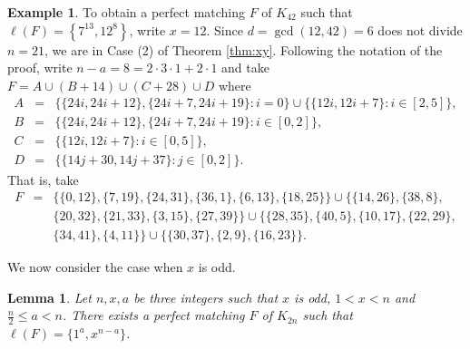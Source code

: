 \documentclass{amsart}
\newtheorem{lem}[defi]{Lemma}
\theoremstyle{definition}
\newtheorem{ex}[defi]{Example}
\numberwithin{equation}{section}
\begin{document}
\begin{ex}
To obtain a perfect matching $F$ of $K_{42}$ such that $\ell(F)=\left\{7^{13}, 12^{8}\right\}$, write
$x=12$. Since $d=\gcd(12,42)=6$ does not divide $n=21$,  we are in Case (2) of Theorem \ref{thm:xy}.
Following the notation of the proof, write
$n-a= 8 = 2\cdot 3 \cdot 1 + 2\cdot 1$ and take $F=A \cup (B+14)\cup (C+28) \cup D$ where
$$\begin{array}{rcl}
A & =&  \{\{24i,24i+12\}, \{24i+7,24i+19\}: i=0\} \cup \{ \{12i,12i+7\} : i \in [2,5]\}, \\
B &=& \{\{24i, 24i+12\}, \{24i+7, 24i+19\}: i \in [0,2]\},\\
C &=& \{\{12i, 12i+7\}: i \in [0,5]\},\\
D &=& \{\{14j+30, 14j+37\}: j \in [0,2]\}.
    \end{array}$$
That is, take
$$\begin{array}{rcl}
F &= & \{  \{ 0,12\},\{ 7,19\}, \{24,31\},\{36,1\},\{6,13\}, \{18,25\}\}\cup
\{ \{14, 26\}, \{38, 8\}, \\
&& \{20, 32\},\{ 21, 33\}, \{3, 15\}, \{27, 39\} \}\cup
\{ \{28,35\}, \{40,5\}, \{10,17\}, \{22,29\}, \\
&& \{34,41\},\{4,11\} \} \cup \{\{30,37\},\{2,9\},\{16,23\}\}.
\end{array}$$
\end{ex}


We now consider the case when $x$ is odd.



\begin{lem}\label{large_a}
Let $n,x,a$ be three integers such that $x$ is odd, $1< x< n$ and $\frac{n}{2}\leq a<n$.
There exists a perfect matching $F$ of $K_{2n}$ such that $\ell(F)=\{1^a, x^{n-a}\}$.
\end{lem}
\end{document}
